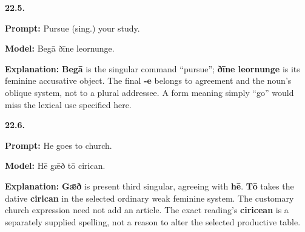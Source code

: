 \par\begin{minipage}{\linewidth}\raggedright
\textbf{22.5.}

\textbf{Prompt:} Pursue (sing.) your study.

\textbf{Model:} Begā ðīne leornunge.

\textbf{Explanation:} \textbf{Begā} is the singular command “pursue”; \textbf{ðīne leornunge} is its feminine accusative object. The final \textbf{-e} belongs to agreement and the noun’s oblique system, not to a plural addressee. A form meaning simply “go” would miss the lexical use specified here.

\end{minipage}\par\addvspace{4pt}

\par\begin{minipage}{\linewidth}\raggedright
\textbf{22.6.}

\textbf{Prompt:} He goes to church.

\textbf{Model:} Hē gǣð tō cirican.

\textbf{Explanation:} \textbf{Gǣð} is present third singular, agreeing with \textbf{hē}. \textbf{Tō} takes the dative \textbf{cirican} in the selected ordinary weak feminine system. The customary church expression need not add an article. The exact reading’s \textbf{ciricean} is a separately supplied spelling, not a reason to alter the selected productive table.

\end{minipage}\par\addvspace{4pt}

